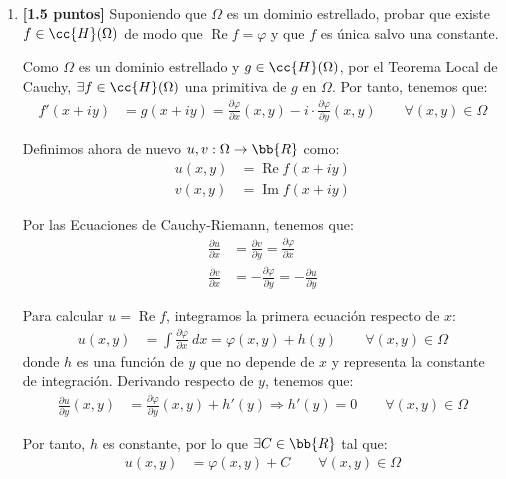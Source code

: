 \documentclass[12pt]{article}
\renewcommand{\Re}{\operatorname{Re}} %
\renewcommand{\Im}{\operatorname{Im}}
\begin{document}
\begin{ejercicio}[3 puntos]
\begin{enumerate}
        \item \textbf{[1.5 puntos]} Suponiendo que $\Omega$ es un dominio estrellado, probar que existe $f \in \cc{H}(\Omega)$ de modo que $\Re f = \varphi$ y que $f$ es única salvo una constante.
        
        Como $\Omega$ es un dominio estrellado y $g\in \cc{H}(\Omega)$, por el Teorema Local de Cauchy, $\exists f\in \cc{H}(\Omega)$ una primitiva de $g$ en $\Omega$. Por tanto, tenemos que:
        \begin{align*}
            f'(x+iy) &= g(x + iy) = \frac{\partial \varphi}{\partial x}(x, y) - i\cdot  \frac{\partial \varphi}{\partial y}(x, y)\qquad \forall (x, y) \in \Omega
        \end{align*}

        Definimos ahora de nuevo $u,v:\Omega\to \bb{R}$ como:
        \begin{align*}
            u(x,y) &= \Re f(x+iy)\\
            v(x,y) &= \Im f(x+iy)
        \end{align*}

        Por las Ecuaciones de Cauchy-Riemann, tenemos que:
        \begin{align*}
            \frac{\partial u}{\partial x} &= \frac{\partial v}{\partial y}= \frac{\partial \varphi}{\partial x}\\
            \frac{\partial v}{\partial x} &= -\frac{\partial \varphi}{\partial y}=-\frac{\partial u}{\partial y}
        \end{align*}

        Para calcular $u=\Re f$, integramos la primera ecuación respecto de $x$:
        \begin{align*}
            u(x,y) &= \int \frac{\partial \varphi}{\partial x}\ dx = \varphi(x,y) + h(y)\qquad \forall (x,y) \in \Omega
        \end{align*}
        donde $h$ es una función de $y$ que no depende de $x$ y representa la constante de integración. Derivando respecto de $y$, tenemos que:
        \begin{align*}
            \frac{\partial u}{\partial y}(x,y) &= \frac{\partial \varphi}{\partial y}(x,y) + h'(y)\Longrightarrow
            h'(y) = 0\qquad \forall (x,y) \in \Omega
        \end{align*}

        Por tanto, $h$ es constante, por lo que $\exists C\in \bb{R}$ tal que:
        \begin{align*}
            u(x,y) &= \varphi(x,y) + C\qquad \forall (x,y) \in \Omega
        \end{align*}  
        

\end{enumerate}
\end{ejercicio}
\end{document}
